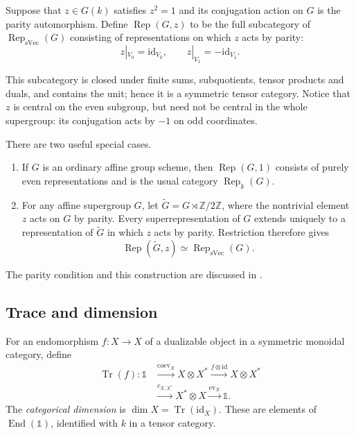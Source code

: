 \begin{definition}
Suppose that $z\in G(k)$ satisfies $z^2=1$ and its conjugation action on $G$ is the parity automorphism. Define $\operatorname{Rep}(G,z)$ to be the full subcategory of $\operatorname{Rep}_{\mathrm{sVec}}(G)$ consisting of representations on which $z$ acts by parity:
\[
 z|_{V_0}=\mathrm{id}_{V_0},\qquad z|_{V_1}=-\mathrm{id}_{V_1}.
\]
\end{definition}
This subcategory is closed under finite sums, subquotients, tensor products and duals, and contains the unit; hence it is a symmetric tensor category. Notice that $z$ is central on the even subgroup, but need not be central in the whole supergroup: its conjugation acts by $-1$ on odd coordinates.

There are two useful special cases.
\begin{enumerate}
\item If $G$ is an ordinary affine group scheme, then $\operatorname{Rep}(G,1)$ consists of purely even representations and is the usual category $\operatorname{Rep}_k(G)$.
\item For any affine supergroup $G$, let $\widetilde G=G\rtimes\mathbb Z/2\mathbb Z$, where the nontrivial element $z$ acts on $G$ by parity. Every superrepresentation of $G$ extends uniquely to a representation of $\widetilde G$ in which $z$ acts by parity. Restriction therefore gives
\[
 \operatorname{Rep}(\widetilde G,z)\simeq\operatorname{Rep}_{\mathrm{sVec}}(G).
\]
\end{enumerate}
The parity condition and this construction are discussed in \cite[Section 9.11]{EGNO}.

\subsection*{Trace and dimension}
\begin{definition}
For an endomorphism $f:X\to X$ of a dualizable object in a symmetric monoidal category, define
\[
\begin{split}
\operatorname{Tr}(f):\mathbb{1}
 &\xrightarrow{\operatorname{coev}_X}X\otimes X^*
 \xrightarrow{f\otimes\mathrm{id}}X\otimes X^*\\
 &\xrightarrow{c_{X,X^*}}X^*\otimes X
 \xrightarrow{\operatorname{ev}_X}\mathbb{1}.
\end{split}
\]
The \emph{categorical dimension} is $\dim X=\operatorname{Tr}(\mathrm{id}_X)$. These are elements of $\operatorname{End}(\mathbb{1})$, identified with $k$ in a tensor category.
\end{definition}

